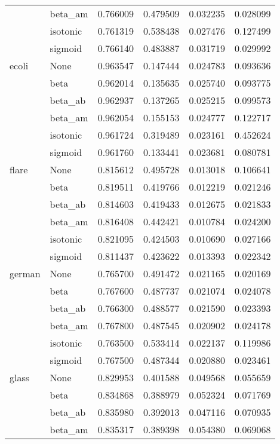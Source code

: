 \begin{tabular}{llrrrr}
        & beta\_am &  0.766009 &  0.479509 &  0.032235 &  0.028099 \\
        & isotonic &  0.761319 &  0.538438 &  0.027476 &  0.127499 \\
        & sigmoid &  0.766140 &  0.483887 &  0.031719 &  0.029992 \\
ecoli & None &  0.963547 &  0.147444 &  0.024783 &  0.093636 \\
        & beta &  0.962014 &  0.135635 &  0.025740 &  0.093775 \\
        & beta\_ab &  0.962937 &  0.137265 &  0.025215 &  0.099573 \\
        & beta\_am &  0.962054 &  0.155153 &  0.024777 &  0.122717 \\
        & isotonic &  0.961724 &  0.319489 &  0.023161 &  0.452624 \\
        & sigmoid &  0.961760 &  0.133441 &  0.023681 &  0.080781 \\
flare & None &  0.815612 &  0.495728 &  0.013018 &  0.106641 \\
        & beta &  0.819511 &  0.419766 &  0.012219 &  0.021246 \\
        & beta\_ab &  0.814603 &  0.419433 &  0.012675 &  0.021833 \\
        & beta\_am &  0.816408 &  0.442421 &  0.010784 &  0.024200 \\
        & isotonic &  0.821095 &  0.424503 &  0.010690 &  0.027166 \\
        & sigmoid &  0.811437 &  0.423622 &  0.013393 &  0.022342 \\
german & None &  0.765700 &  0.491472 &  0.021165 &  0.020169 \\
        & beta &  0.767600 &  0.487737 &  0.021074 &  0.024078 \\
        & beta\_ab &  0.766300 &  0.488577 &  0.021590 &  0.023393 \\
        & beta\_am &  0.767800 &  0.487545 &  0.020902 &  0.024178 \\
        & isotonic &  0.763500 &  0.533414 &  0.022137 &  0.119986 \\
        & sigmoid &  0.767500 &  0.487344 &  0.020880 &  0.023461 \\
glass & None &  0.829953 &  0.401588 &  0.049568 &  0.055659 \\
        & beta &  0.834868 &  0.388979 &  0.052324 &  0.071769 \\
        & beta\_ab &  0.835980 &  0.392013 &  0.047116 &  0.070935 \\
        & beta\_am &  0.835317 &  0.389398 &  0.054380 &  0.069068 \\

\end{tabular}
